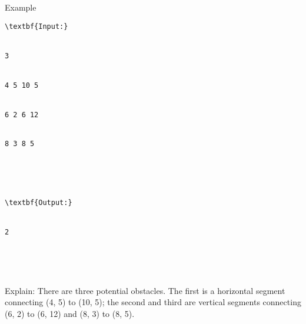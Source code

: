 Example
\begin{verbatim}
\textbf{Input:}


3 


4 5 10 5 


6 2 6 12 


8 3 8 5 





\textbf{Output:}


2





\end{verbatim}

   Explain:       There are three potential obstacles. The first is a horizontal segment connecting (4, 5) to (10, 5); the second and third are vertical segments connecting (6, 2) to (6, 12) and (8, 3) to (8, 5).